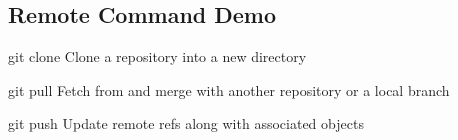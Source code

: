 \subsection{Remote Command Demo}

\begin{frame}[fragile]
\begin{block}{git clone}
Clone a repository into a new directory
\end{block}
\begin{block}{git pull}
Fetch from and merge with another repository or a local branch
\end{block}
\begin{block}{git push}
Update remote refs along with associated objects
\end{block}
\end{frame}

